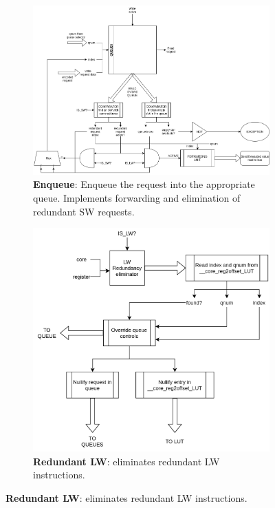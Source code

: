 \documentclass[hidelinks,12pt]{article}
\begin{document}
\begin{figure}[H]
    \ContinuedFloat
    \centering

    \begin{subfigure}[h]{\textwidth}
        \begin{center}
            \includegraphics[scale=0.5]{img/enqueue.png}
            \caption{\textbf{Enqueue}: Enqueue the request into the appropriate queue. Implements forwarding and elimination of redundant SW requests.}

        \end{center}

    \end{subfigure}
    \begin{subfigure}[h]{\textwidth}
        \begin{center}
            \includegraphics[scale=0.23]{img/lw_redundancy.png}
            \caption{\textbf{Redundant LW}: eliminates redundant LW instructions.}

        \end{center}

    \end{subfigure}
\end{figure}
\end{document}
